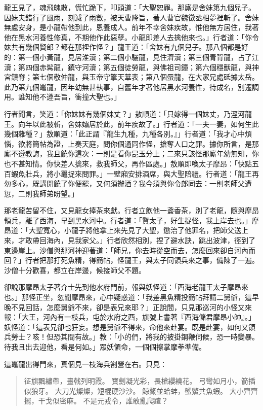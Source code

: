 龍王見了，魂飛魄散，慌忙跪下，叩頭道：「大聖恕罪。那廝是舍妹第九個兒子。因妹夫錯行了風雨，刻減了雨數，被天曹降旨，著人曹官魏徵丞相夢裡斬了。舍妹無處安身，是小龍帶他到此，恩養成人。前年不幸舍妹疾故，惟他無方居住，我著他在黑水河養性修真，不期他作此惡孽。小龍即差人去擒他來也。」行者道：「你令妹共有幾個賢郎？都在那裡作怪？」龍王道：「舍妹有九個兒子。那八個都是好的：第一個小黃龍，見居淮瀆；第二個小驪龍，見住濟瀆；第三個青背龍，占了江瀆；第四個赤髯龍，鎮守河瀆；第五個徒勞龍，與佛祖司鐘；第六個穩獸龍，與神宮鎮脊；第七個敬仲龍，與玉帝守擎天華表；第八個蜃龍，在大家兄處砥據太岳。此乃第九個鼉龍，因年幼無甚執事，自舊年才著他居黑水河養性，待成名，別遷調用。誰知他不遵吾旨，衝撞大聖也。」

行者聞言，笑道：「你妹妹有幾個妹丈？」敖順道：「只嫁得一個妹丈，乃涇河龍王。向年以此被斬，舍妹孀居於此，前年疾故了。」行者道：「一夫一妻，如何生此幾個雜種？」敖順道：「此正謂『龍生九種，九種各別。』」行者道：「我才心中煩惱，欲將簡帖為證，上奏天庭，問你個通同作怪，搶奪人口之罪。據你所言，是那廝不遵教誨，我且饒你這次：一則是看你昆玉分上；二來只該怪那廝年幼無知，你也不甚知情。你快差人擒來，救我師父，再作區處。」敖順即喚太子摩昂：「快點五百蝦魚壯兵，將小鼉捉來問罪。」一壁廂安排酒席，與大聖陪禮。行者道：「龍王再勿多心，既講開饒了你便罷，又何須辦酒？我今須與你令郎同去：一則老師父遭愆，二則我師弟盼望。」

那老龍苦留不住，又見龍女捧茶來獻。行者立飲他一盞香茶，別了老龍，隨與摩昂領兵，離了西海，早到黑水河中。行者道：「賢太子，好生捉怪，我上岸去也。」摩昂道：「大聖寬心，小龍子將他拿上來先見了大聖，懲治了他罪名，把師父送上來，才敢帶回海內，見我家父。」行者欣然相別，捏了避水訣，跳出波津，徑到了東邊崖上。沙僧與那河神迎著道：「師兄，你去時從空而去，怎麼回來卻自河內而回？」行者把那打死魚精，得簡帖，怪龍王，與太子同領兵來之事，備陳了一遍。沙僧十分歡喜，都立在岸邊，候接師父不題。

卻說那摩昂太子著介士先到他水府門前，報與妖怪道：「西海老龍王太子摩昂來也。」那怪正坐，忽聞摩昂來，心中疑惑道：「我差黑魚精投簡帖拜請二舅爺，這早晚不見回話，怎麼舅爺不來，卻是表兄來耶？」正說間，只見那巡河的小怪又來報：「大王，河內有一枝兵，屯於水府之西，旗號上書著『西海儲君摩昂小帥』。」妖怪道：「這表兄卻也狂妄。想是舅爺不得來，命他來赴宴。既是赴宴，如何又領兵勞士？咳！但恐其間有故。」教：「小的們，將我的披掛鋼鞭伺候，恐一時變暴。待我且出去迎他，看是何如。」眾妖領命，一個個擦掌摩拳準備。

這鼉龍出得門來，真個見一枝海兵劄營在右。只見：
\begin{quote}
征旗飄繡帶，畫戟列明霞。
寶劍凝光彩，長槍纓繞花。
弓彎如月小，箭插似狼牙。
大刀光燦燦，短棍硬沙沙。
鯨鰲並蛤蚌，蟹鱉共魚蝦。
大小齊齊擺，干戈似密麻。
不是元戎令，誰敢亂爬蹅？
\end{quote}


